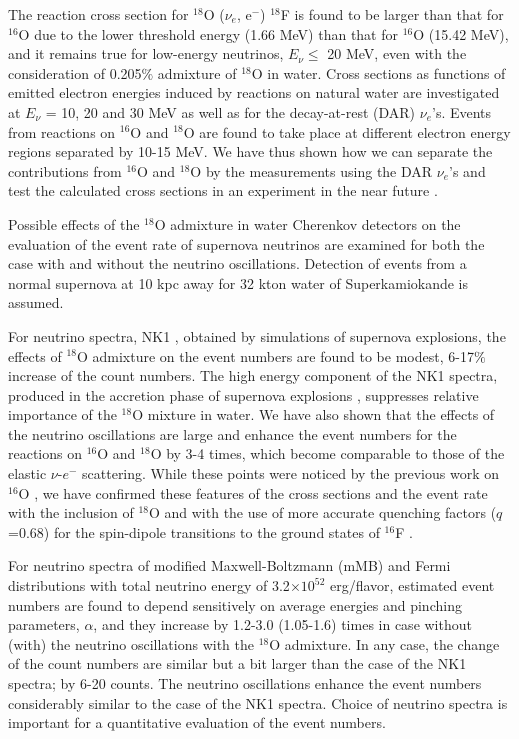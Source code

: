 \documentclass[preprint,12pt]{elsarticle}
\begin{document}
The reaction cross section for $^{18}$O ($\nu_e$, e$^{-}$) $^{18}$F is found to be larger than that for $^{16}$O due to the lower threshold energy (1.66 MeV) than that for $^{16}$O (15.42 MeV), and it remains true for low-energy neutrinos, $E_{\nu}\leq$ 20 MeV, even with the consideration of 0.205$\%$ admixture of $^{18}$O in water. 
Cross sections as functions of emitted electron energies induced by reactions on natural water are investigated at $E_{\nu}$ = 10, 20 and 30 MeV as well as for the decay-at-rest (DAR) $\nu_e$'s. 
Events from reactions on $^{16}$O and $^{18}$O are found to take place at different electron energy regions separated by 10-15 MeV. 
We have thus shown how we can separate the contributions from $^{16}$O and $^{18}$O by the measurements using the DAR $\nu_e$'s and test the calculated cross sections 
in an experiment in the near future \cite{COHERENT}.

Possible effects of the $^{18}$O admixture in water Cherenkov detectors on the evaluation of the event rate of supernova neutrinos are examined for both the case with and without the neutrino oscillations. 
Detection of events from a normal supernova at 10 kpc away 
for 32 kton water of Superkamiokande is assumed.

For neutrino spectra, NK1 \cite{Nakazato2018}, obtained by simulations of supernova explosions, the effects of $^{18}$O admixture on the event numbers are found to be modest, 6-17$\%$ increase of the count numbers.
The high energy component of the NK1 spectra, produced in the accretion phase of supernova explosions \cite{Naka2013}, suppresses relative importance of the $^{18}$O mixture in water.  
We have also shown that the effects of the neutrino oscillations are large and enhance the event numbers for the reactions on $^{16}$O and $^{18}$O by 3-4 times, which become comparable to those of the elastic $\nu$-$e^{-}$ scattering.
While these points were noticed by the previous work on $^{16}$O \cite{Nakazato2018}, 
we have confirmed these features of the cross sections and the event rate
with the inclusion of $^{18}$O and with the use of more accurate quenching factors ($q$=0.68) for the spin-dipole transitions to
the ground states of $^{16}$F 
\cite{PTEP2022}.

For neutrino spectra of modified Maxwell-Boltzmann (mMB) and Fermi distributions  
with total neutrino energy of 
3.2$\times 10^{52}$ erg/flavor,
estimated event numbers are found to depend sensitively on 
average energies 
and pinching parameters, $\alpha$,
and they increase by 1.2-3.0 (1.05-1.6) times in case without (with) the neutrino oscillations with the $^{18}$O admixture.
In any case, the change of the count numbers are similar but a bit larger than the case of the NK1 spectra; by 6-20 counts. 
The neutrino oscillations enhance the event numbers considerably similar to the case of the NK1 spectra.
Choice of neutrino spectra is important for a quantitative evaluation of the event numbers. 
\end{document}
